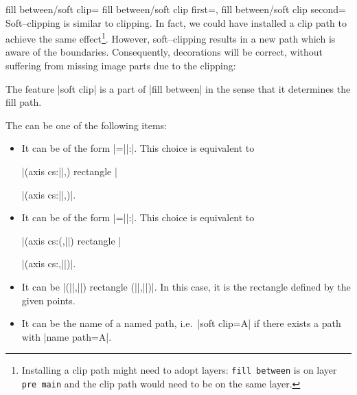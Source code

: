 \begin{tikzkeylist}{%
	fill between/soft clip=
	fill between/soft clip first=,
	fill between/soft clip second=%
}
	Soft--clipping is similar to clipping. In fact, we could have installed a clip path to achieve the same effect\footnote{Installing a clip path might need to adopt layers: \texttt{fill between} is on layer \texttt{pre main} and the clip path would need to be on the same layer.}. However, soft--clipping results in a new path which is aware of the boundaries. Consequently, decorations will be correct, without suffering from missing image parts due to the clipping:
\begin{codeexample}[]
\end{codeexample}

	The feature |soft clip| is a part of |fill between| in the sense that it determines the fill path.

	The  can be one of the following items:
	\begin{itemize}
		\item It can be of the form |=||:|. This choice is equivalent to

			|(axis cs:||,) rectangle |

			|(axis cs:||,)|.
		\item It can be of the form |=||:|. This choice is equivalent to

			|(axis cs:(,||) rectangle |

			|(axis cs:,||)|.
		\item It can be |(||,||) rectangle (||,||)|. In this case, it is the rectangle defined by the given points.
		\item It can be the name of a named path, i.e.\ |soft clip=A| if there exists a path with |name path=A|.


\end{itemize}
\end{tikzkeylist}

